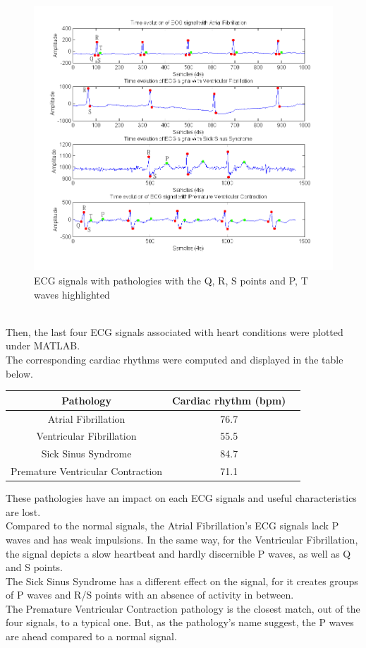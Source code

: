 \documentclass[11pt]{report}
\begin{document}
		\begin{figure}[ht]
			\centering
			\includegraphics[scale=0.65]{images/Q312_2.png}
			\caption{ECG signals with pathologies with the Q, R, S points and P, T waves highlighted}
			\label{Q312_2}
		\end{figure}
		\\
		Then, the last four ECG signals associated with heart conditions were plotted under MATLAB.\\
		The corresponding cardiac rhythms were computed and displayed in the table below.\\ 
		\begin{center}
			\begin{tabular}{|c|c|c|}
				\hline
				\textbf{Pathology} & \textbf{Cardiac rhythm (bpm)} \\
				\hline
				Atrial Fibrillation & 76.7 \\ 
				\hline
				Ventricular Fibrillation & 55.5 \\
				\hline
				Sick Sinus Syndrome & 84.7 \\
				\hline
				Premature Ventricular Contraction & 71.1 \\
				\hline
			\end{tabular}
		\end{center}
		These pathologies have an impact on each ECG signals and useful characteristics are lost.\\
		Compared to the normal signals, the Atrial Fibrillation's ECG signals lack P waves and has weak impulsions. In the same way, for the Ventricular Fibrillation, the signal depicts a slow heartbeat and hardly discernible P waves, as well as Q and S points.\\
		The Sick Sinus Syndrome has a different effect on the signal, for it creates groups of P waves and R/S points with an absence of activity in between.\\
		The Premature Ventricular Contraction pathology is the closest match, out of the four signals, to a typical one. But, as the pathology's name suggest, the P waves are ahead compared to a normal signal.\\
\end{document}
